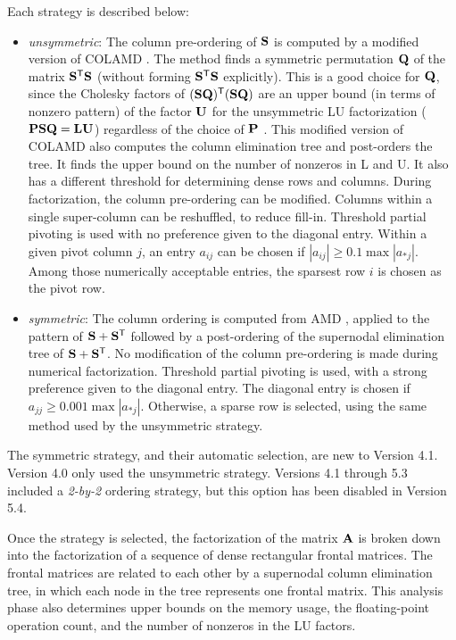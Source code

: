 \documentclass[11pt]{article}
\newcommand{\m}[1]{{\bf{#1}}}       %
\newcommand{\tr}{^{\sf T}}          %
\begin{document}
Each strategy is described below:
\begin{itemize}
\item {\em unsymmetric}:
The column pre-ordering of $\m{S}$ is computed by a modified version of COLAMD
\cite{DavisGilbertLarimoreNg00_algo,DavisGilbertLarimoreNg00}.
The method finds a symmetric permutation $\m{Q}$ of the matrix $\m{S}\tr\m{S}$
(without forming $\m{S}\tr\m{S}$ explicitly).  This is a good choice for
$\m{Q}$, since the Cholesky factors of $\m{(SQ)\tr(SQ)}$ are an upper bound (in
terms of nonzero pattern) of the factor $\m{U}$ for the unsymmetric LU
factorization ($\m{PSQ}=\m{LU}$) regardless of the choice of $\m{P}$
\cite{GeorgeNg85,GeorgeNg87,GilbertNg93}.  This modified version of
COLAMD also computes the column elimination tree and post-orders the
tree.  It finds the upper bound on the number of nonzeros in L and U.
It also has a different threshold for determining dense rows and columns.
During factorization, the column pre-ordering can be modified.
Columns within a single super-column can be reshuffled, to reduce fill-in.
Threshold partial pivoting is used with no preference given to the diagonal
entry.  Within a given pivot column $j$, an entry $a_{ij}$ can be chosen if
$|a_{ij}| \ge 0.1 \max |a_{*j}|$.  Among those numerically acceptable
entries, the sparsest row $i$ is chosen as the pivot row.

\item {\em symmetric}:
The column ordering is computed from AMD
\cite{AmestoyDavisDuff96,AmestoyDavisDuff03},
applied to the pattern of $\m{S}+\m{S}\tr$
followed by a post-ordering of the supernodal elimination
tree of $\m{S}+\m{S}\tr$.
No modification of the column pre-ordering is made during numerical
factorization.  Threshold partial pivoting is used, with a strong
preference given to the diagonal entry.  The diagonal entry is chosen if
$a_{jj} \ge 0.001 \max |a_{*j}|$.  Otherwise, a sparse row is selected,
using the same method used by the unsymmetric strategy.

\end{itemize}

The symmetric strategy, and their automatic selection,
are new to Version 4.1.  Version 4.0 only used the unsymmetric strategy.
Versions 4.1 through 5.3 included a {\em 2-by-2} ordering strategy,
but this option has been disabled in Version 5.4.

Once the strategy is selected,
the factorization of the matrix $\m{A}$ is broken down into the factorization
of a sequence of dense rectangular frontal matrices.  The frontal matrices are
related to each other by a supernodal column elimination tree, in which each
node in the tree represents one frontal matrix.  This analysis phase also
determines upper bounds on the memory usage, the floating-point operation count,
and the number of nonzeros in the LU factors.
\end{document}
